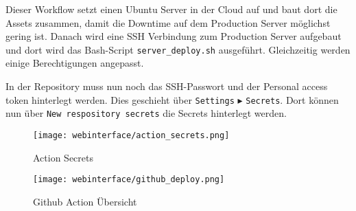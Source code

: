 Dieser Workflow setzt einen Ubuntu Server in der Cloud auf und baut dort die
Assets zusammen, damit die Downtime auf dem Production Server möglichst gering
ist. Danach wird eine SSH Verbindung zum Production Server aufgebaut und dort
wird das Bash-Script \verb|server_deploy.sh| ausgeführt. Gleichzeitig werden
einige Berechtigungen angepasst.

In der Repository muss nun noch das SSH-Passwort und der Personal access token
hinterlegt werden. Dies geschieht über \verb|Settings| $\blacktriangleright$ \verb|Secrets|. Dort
können nun über \verb|New respository secrets| die Secrets hinterlegt werden.

\begin{figure}[H]
  \centering
  \texttt{[image: webinterface/action\_secrets.png]}
  \caption{Action Secrets}
\end{figure}

\begin{figure}[H]
  \centering
  \texttt{[image: webinterface/github\_deploy.png]}
  \caption{Github Action Übersicht}
\end{figure}